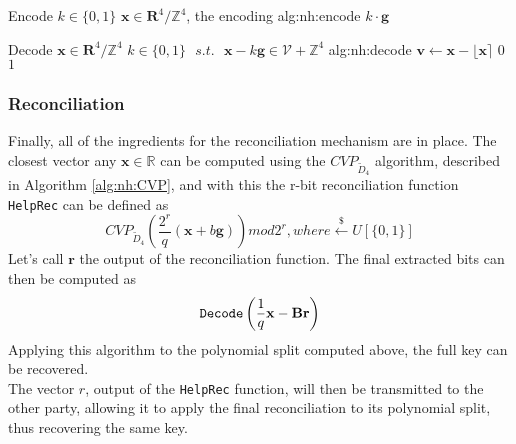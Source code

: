\begin{b_algorithm}{Encode}
{$k \in \{0,1\}$}
{$\textbf{x} \in \mathbf{R}^4/\mathbb{Z}^4$, the encoding}
{alg:nh:encode}
\RETURN $k\cdot\textbf{g}$
\end{b_algorithm}

\begin{b_algorithm}{Decode}
{$\textbf{x} \in \mathbf{R}^4/\mathbb{Z}^4$}
{$k \in \{0,1\}\text{ }s.t.\text{ }\textbf{x} - k\textbf{g} \in \mathscr{V}+\mathbb{Z}^4$}
{alg:nh:decode}
\STATE $\textbf{v} \gets \mathbf{x} - \lfloor\mathbf{x}\rceil$
    \RETURN $0$
\ELSE
    \RETURN $1$
\ENDIF
\end{b_algorithm}

\subsubsection{Reconciliation}
Finally, all of the ingredients for the reconciliation mechanism are in place. The closest vector any $\mathbf{x}\in\mathbb{R}$ can be computed using the $CVP_{\tilde{D}_4}$ algorithm, described in Algorithm \ref{alg:nh:CVP}, and with this the r-bit reconciliation function \verb|HelpRec| can be defined as 
\begin{equation}
CVP_{\tilde{D}_4}\left(\frac{2^r}{q}(\mathbf{x}+b\mathbf{g})\right) mod 2^r, where \xleftarrow{\$}U[\{0,1\}]
\end{equation}
Let's call $\mathbf{r}$ the output of the reconciliation function. The final extracted bits can then be computed as 
\begin{equation}
\verb|Decode|\left(\frac{1}{q}\mathbf{x}-\mathbf{Br}\right) 
\end{equation}
Applying this algorithm to the polynomial split computed above, the full key can be recovered.\\
The vector $r$, output of the \verb|HelpRec| function, will then be transmitted to the other party, allowing it to apply the final reconciliation to its polynomial split, thus recovering the same key.


